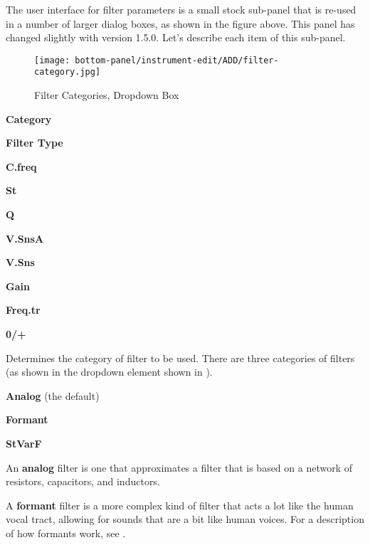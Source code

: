    The user interface for filter parameters is a small stock sub-panel that
   is re-used in a number of larger dialog boxes, as shown in the figure
   above.  This panel has changed slightly with version 1.5.0.
   Let's describe each item of this sub-panel.


\begin{figure}[H]
   \centering
   \texttt{[image: bottom-panel/instrument-edit/ADD/filter-category.jpg]}
   \caption[Filter Categories Dropdown]{Filter Categories, Dropdown Box}
   \label{fig:filter_categories_dropdown}
\end{figure}

   \begin{enumber}
      \item \textbf{Category}
      \item \textbf{Filter Type}
      \item \textbf{C.freq}
      \item \textbf{St}
      \item \textbf{Q}
      \item \textbf{V.SnsA}
      \item \textbf{V.Sns}
      \item \textbf{Gain}
      \item \textbf{Freq.tr}
      \item \textbf{0/+}
   \end{enumber}

   \setcounter{ItemCounter}{0}      %

   Determines the category of filter to be used.
   There are three categories of filters
   (as shown in the dropdown element shown in
   ).

\begin{enumber}                     %
   \item \textbf{Analog} (the default)
   \item \textbf{Formant}
   \item \textbf{StVarF}
\end{enumber}

   An \textbf{analog} filter
   is one that approximates a filter that is based on
   a network of resistors, capacitors, and inductors.

   A \textbf{formant} filter
   is a more complex kind of filter that acts a lot
   like the human vocal tract, allowing for sounds that
   are a bit like human voices.  For a description of how formants work,
   see .

